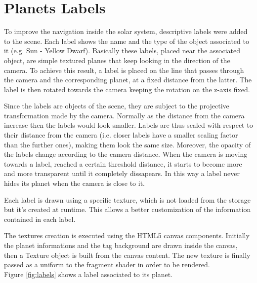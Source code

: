 \documentclass[paper=a4, fontsize=11pt]{scrartcl} %
\numberwithin{equation}{section} %
\numberwithin{figure}{section} %
\numberwithin{table}{section} %
\theoremstyle{definition}
\begin{document}
\section{Planets Labels}

To improve the navigation inside the solar system, descriptive labels
were added to the scene. Each label shows the name and the type of the
object associated to it (e.g. Sun - Yellow Dwarf).
Basically these labels, placed near the associated object, are simple textured planes that keep looking in the direction of the camera. To achieve this result, a label is placed on the line that passes through the camera and the corresponding planet, at a fixed distance from the latter. The label is then rotated towards the camera
keeping the rotation on the z-axis fixed.

Since the labels are objects of the scene, they are subject to the projective
transformation made by the camera. Normally as the distance from the camera increase then the labels would look smaller. Labels are thus scaled with respect to their distance from the camera (i.e. closer labels have a smaller scaling factor than the further ones), making them look the same size.
Moreover, the opacity of the labels change according to the camera distance.
When the camera is moving towards a label, reached a certain threshold distance,
it starts to become more and more
transparent until it completely dissapears.
In this way a label never hides its planet when the camera is close to it.

Each label is drawn using a specific texture, which is not loaded from the
storage but it's created at runtime. This allows a better customization of the
information contained in each label.

The textures creation is executed using the HTML5 canvas components. Initially the planet informations and the tag background are drawn inside the canvas, then a Texture object is built from the canvas content. The new texture is finally passed as a uniform to the fragment shader in order to be rendered.\\
Figure \ref{fig:labels} shows a label associated to its planet.
\end{document}
